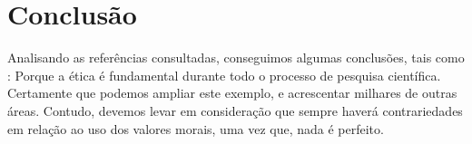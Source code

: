 \documentclass[12pt]{article}
\begin{document}
\section{Conclusão}\label{sec:conclusao}
Analisando as referências consultadas, conseguimos algumas conclusões, tais como : Porque a ética é fundamental durante todo o processo de pesquisa científica. Certamente que podemos ampliar este exemplo, e acrescentar milhares de outras áreas. Contudo, devemos levar em consideração que sempre haverá contrariedades em relação ao uso dos valores morais, uma vez que, nada é perfeito.



 



\end{document}

